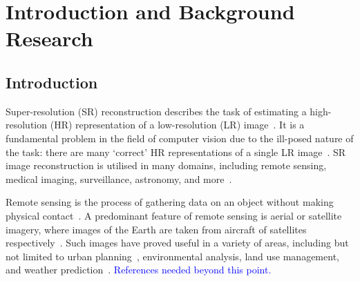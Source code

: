 \chapter{Introduction and Background Research}

\label{chapter1}

\section{Introduction}

Super-resolution (SR) reconstruction describes the task of estimating a high-resolution (HR) representation of a low-resolution (LR) image~\cite{superResOverview}. It is a fundamental problem in the field of computer vision due to the ill-posed nature of the task: there are many `correct' HR representations of a single LR image~\cite{superResChallenges,superResRemoteSensingOverview}. SR image reconstruction is utilised in many domains, including remote sensing, medical imaging, surveillance, astronomy, and more~\cite{superResRemoteSensingChallenges, superResRemoteSensingOverview, superResMedicalImaging, superResSurveillance, superResAstronomy, superResUses}.

Remote sensing is the process of gathering data on an object without making physical contact~\cite{remoteSensing}. A predominant feature of remote sensing is aerial or satellite imagery, where images of the Earth are taken from aircraft of satellites respectively~\cite{ref}. Such images have proved useful in a variety of areas, including but not limited to urban planning~\cite{remoteSensingUses}, environmental analysis, land use management, and weather prediction~\cite{remoteSensingGANsReview}. \textcolor{blue}{References needed beyond this point.}

